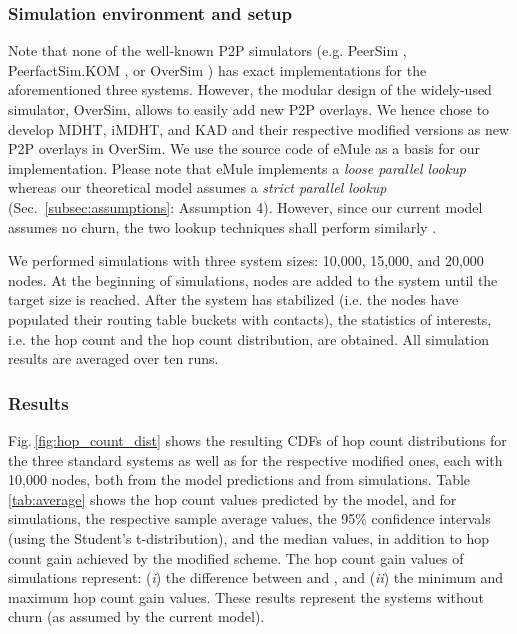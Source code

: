 \documentclass[10pt, conference, compsocconf, letterpaper]{IEEEtran}
\begin{document}
\subsubsection{\textbf{Simulation environment and setup}} Note that none of the well-known P2P simulators (e.g. PeerSim \cite{Montresor09peersim}, PeerfactSim.KOM \cite{stingl11peerfactsim}, or OverSim \cite{baumgart07oversim}) has exact implementations for the aforementioned three systems. However, the modular design of the widely-used simulator, OverSim, allows to easily add new P2P overlays. We hence chose to develop MDHT, iMDHT, and KAD and their respective modified versions as new P2P overlays in OverSim. We use the source code of eMule as a basis for our implementation. Please note that eMule implements a \emph{loose parallel lookup} whereas our theoretical model assumes a
\emph{strict parallel lookup} (Sec.~\ref{subsec:assumptions}: Assumption 4). However, since our current model assumes no churn, the two lookup techniques shall perform similarly \cite{stutzbach06improving}. 

We performed simulations with three system sizes: 10,000, 15,000, and 20,000 nodes. At the beginning of simulations, nodes are added to the system until the target size is reached. After the system has stabilized (i.e. the nodes have populated their routing table buckets with contacts), the statistics of interests, i.e. the hop count and the hop count distribution, are obtained. All simulation results are averaged over ten runs.



\vspace{3pt}
\subsubsection{\textbf{Results}} Fig.\,\ref{fig:hop_count_dist} shows the resulting CDFs of hop count distributions for the three standard systems as well as for the respective modified ones, each with 10,000 nodes, both from the model predictions and from simulations. Table \,\ref{tab:average} shows the hop count values predicted by the model, and for simulations, the respective sample average values, the 95\% confidence intervals (using the Student's t-distribution), and the median values, in addition to hop count gain achieved by the modified scheme. The hop count gain values of simulations represent: (\emph{i}) the difference between  and , and (\emph{ii}) the minimum and maximum hop count gain values. These results represent the systems without churn (as assumed by the current model).
\end{document}
